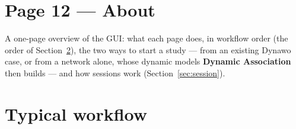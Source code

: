 \documentclass[a4paper,11pt]{article}
\begin{document}
\section{Page 12 --- About}

A one-page overview of the GUI: what each page does, in workflow order (the
order of Section~\ref{sec:workflow}), the two ways to start a study --- from
an existing Dynawo case, or from a network alone, whose dynamic models
\textbf{Dynamic Association} then builds --- and how sessions work
(Section~\ref{sec:session}).

\section{Typical workflow}
\label{sec:workflow}
\end{document}
